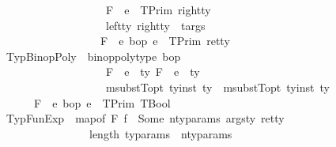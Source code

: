 \begin{isabellebody}
\ \ \ \ \ \ \ \ \ \ \ \ \ \ \ \ \ \ \ \ \ F{\isacharcomma}{\kern0pt}{\isasymDelta}\ {\isasymturnstile}\ e{}\ {\isacharcolon}{\kern0pt}\ TPrim\ right{\isacharunderscore}{\kern0pt}ty{\isacharsemicolon}{\kern0pt}\isanewline
\ \ \ \ \ \ \ \ \ \ \ \ \ \ \ \ \ \ \ \ \ {\isacharparenleft}{\kern0pt}left{\isacharunderscore}{\kern0pt}ty{\isacharcomma}{\kern0pt}\ right{\isacharunderscore}{\kern0pt}ty{\isacharparenright}{\kern0pt}\ {\isasymin}\ targs\ \ {\isasymrbrakk}\ {\isasymLongrightarrow}\isanewline
\ \ \ \ \ \ \ \ \ \ \ \ \ \ \ \ \ \ \ \ F{\isacharcomma}{\kern0pt}{\isasymDelta}\ {\isasymturnstile}\ e{}\ {\isasymguillemotleft}bop{\isasymguillemotright}\ e{}\ {\isacharcolon}{\kern0pt}\ TPrim\ ret{\isacharunderscore}{\kern0pt}ty{\isachardoublequoteclose}\isanewline
\ \ \isanewline
\ \ {\isacharbar}{\kern0pt}\ TypBinopPoly{\isacharcolon}{\kern0pt}\ {\isachardoublequoteopen}{\isasymlbrakk}\ binop{\isacharunderscore}{\kern0pt}poly{\isacharunderscore}{\kern0pt}type\ bop{\isacharsemicolon}{\kern0pt}\ \isanewline
\ \ \ \ \ \ \ \ \ \ \ \ \ \ \ \ \ \ \ \ \ F{\isacharcomma}{\kern0pt}{\isasymDelta}\ {\isasymturnstile}\ e{}\ {\isacharcolon}{\kern0pt}\ ty{}{\isacharsemicolon}{\kern0pt}\ F{\isacharcomma}{\kern0pt}{\isasymDelta}\ {\isasymturnstile}\ e{}\ {\isacharcolon}{\kern0pt}\ ty{}{\isacharsemicolon}{\kern0pt}\isanewline
\ \ \ \ \ \ \ \ \ \ \ \ \ \ \ \ \ \ \ \ \ msubstT{\isacharunderscore}{\kern0pt}opt\ ty{\isacharunderscore}{\kern0pt}inst\ ty{}\ {\isacharequal}{\kern0pt}\ msubstT{\isacharunderscore}{\kern0pt}opt\ ty{\isacharunderscore}{\kern0pt}inst\ ty{}{\isasymrbrakk}\ {\isasymLongrightarrow}\ \isanewline
\ \ \ \ \ \ \ \ F{\isacharcomma}{\kern0pt}{\isasymDelta}\ {\isasymturnstile}\ e{}\ {\isasymguillemotleft}bop{\isasymguillemotright}\ e{}\ {\isacharcolon}{\kern0pt}\ TPrim\ {\isacharparenleft}{\kern0pt}TBool{\isacharparenright}{\kern0pt}{\isachardoublequoteclose}\isanewline
\isanewline
\ \ {\isacharbar}{\kern0pt}\ TypFunExp{\isacharcolon}{\kern0pt}\ {\isachardoublequoteopen}{\isasymlbrakk}\ map{\isacharunderscore}{\kern0pt}of\ F\ f\ {\isacharequal}{\kern0pt}\ Some\ {\isacharparenleft}{\kern0pt}n{\isacharunderscore}{\kern0pt}ty{\isacharunderscore}{\kern0pt}params{\isacharcomma}{\kern0pt}\ args{\isacharunderscore}{\kern0pt}ty{\isacharcomma}{\kern0pt}\ ret{\isacharunderscore}{\kern0pt}ty{\isacharparenright}{\kern0pt}{\isacharsemicolon}{\kern0pt}\isanewline
\ \ \ \ \ \ \ \ \ \ \ \ \ \ \ \ \ \ length\ ty{\isacharunderscore}{\kern0pt}params\ {\isacharequal}{\kern0pt}\ n{\isacharunderscore}{\kern0pt}ty{\isacharunderscore}{\kern0pt}params{\isacharsemicolon}{\kern0pt}\isanewline

\end{isabellebody}
